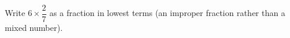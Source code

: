 Write $6\times\dfrac{2}{7}$ as a fraction in lowest terms (an improper fraction rather than a mixed number).
